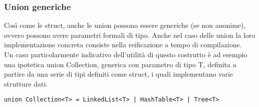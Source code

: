 \subsubsection{Union generiche}
Così come le struct, anche le union possono essere generiche (se non anonime), ovvero possono avere parametri formali di tipo. Anche 
nel caso delle union la loro implementazione concreta consiste nella reificazione a tempo di compilazione. \\

Un caso particolarmente indicativo dell’utilità di questo costrutto è ad esempio una ipotetica union Collection, generica 
con parametro di tipo T, definita a partire da una serie di tipi definiti come struct, i quali implementano varie strutture dati. \\

\vspace{0.5cm}
\begin{lstlisting}[frame=single]
union Collection<T> = LinkedList<T> | HashTable<T> | Tree<T>
\end{lstlisting}
\vspace{0.5cm}